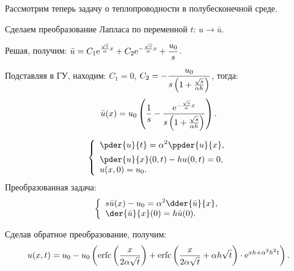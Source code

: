 \begin{minipage}{.6\textwidth}
    Рассмотрим теперь задачу о теплопроводности в полубесконечной среде.

    Сделаем преобразование Лапласа по переменной \( t \): \( u \to \bar{u} \).
        
    Решая, получим: \( \displaystyle \bar{u} = C_1\mathrm{e}^{\frac{\sqrt{s}}{\alpha}x} +
    C_2\mathrm{e}^{-\frac{\sqrt{s}}{\alpha}x} + \frac{u_0}{s} \).

    Подставляя в ГУ, находим: \( C_1 = 0 \), \( \displaystyle C_2 =
    -\frac{u_0}{s\left(1 + \frac{\sqrt{s}}{\alpha h}\right)} \), тогда:
    \[
        \bar{u}(x) = u_0\left(\frac{1}{s} - \frac{\mathrm{e}^{-\frac{\sqrt{s}}
        {\alpha}x}}{s\left(1 + \frac{\sqrt{s}}{\alpha h}\right)}\right).
    \]
\end{minipage}
\hfill
\begin{minipage}{.3\textwidth}
    \flushright
    \[
        \left\{ \begin{array}{l}
            \ds \pder{u}{t} = \alpha^2 \ppder{u}{x}, \\[.5em]
            \ds \pder{u}{x}(0,t) - hu(0, t) = 0, \\
            u(x, 0) = u_0.
        \end{array} \right.
    \]
    Преобразованная задача:
    \[
        \left\{ \begin{array}{l}
            \ds s\bar{u}(x) - u_0 = \alpha^2\dder{\bar{u}}{x}, \\
            \ds \der{\bar{u}}{x}(0) = h\bar{u}(0).
        \end{array} \right.
    \]
\end{minipage}

Сделав обратное преобразование, получим:
\[
    u(x, t) = u_0 - u_0\left(\mathrm{erfc}\left(\frac{x}{2\alpha\sqrt{t}}\right) + 
    \mathrm{erfc}\left(\frac{x}{2\alpha\sqrt{t}} + \alpha h\sqrt{t}\right)\cdot
    \mathrm{e}^{xh + \alpha^2h^2 t}\right).
\]

\newpage
